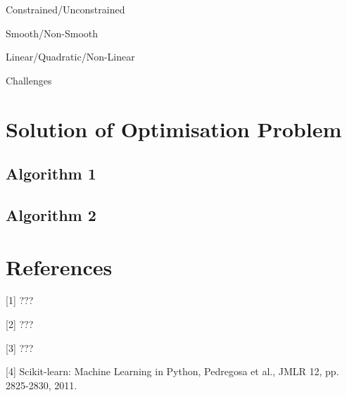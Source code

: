 \documentclass[10pt, a4paper]{amsart}
\begin{document}
Constrained/Unconstrained

Smooth/Non-Smooth

Linear/Quadratic/Non-Linear

Challenges


\section{Solution of Optimisation Problem}

\subsection{Algorithm 1}\hfill

\subsection{Algorithm 2}\hfill


\section{References}

[1] ???

[2] ???

[3] ???

[4] Scikit-learn: Machine Learning in Python, Pedregosa et al., JMLR 12, pp. 2825-2830, 2011.
\end{document}
